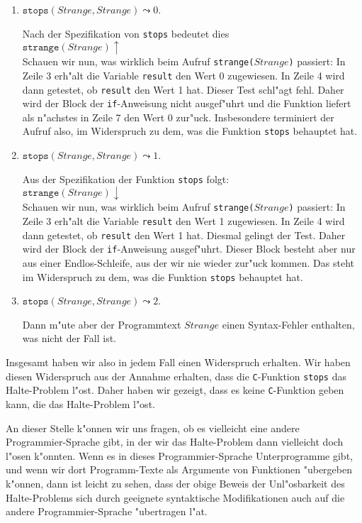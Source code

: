 \begin{enumerate}
\item $\mathtt{stops}(Strange, Strange) \leadsto 0$. 

      Nach der Spezifikation von \texttt{stops} bedeutet dies \\[0.3cm]
      \hspace*{1.3cm} $\mathtt{strange}(Strange) \uparrow$ \\[0.3cm]
      Schauen wir nun, was wirklich beim Aufruf \texttt{strange($Strange$)} passiert:
      In Zeile 3 erh"alt die Variable \texttt{result} den Wert 0 zugewiesen.  In Zeile 4
      wird dann getestet, ob \texttt{result} den Wert 1 hat.  Dieser Test schl"agt fehl.
      Daher wird der Block der \texttt{if}-Anweisung nicht ausgef"uhrt und die Funktion liefert als
      n"achstes in Zeile 7 den Wert 0 zur"uck.  Insbesondere terminiert der Aufruf also, im
      Widerspruch zu dem, was die Funktion \texttt{stops} behauptet hat.
\item  $\mathtt{stops}(Strange, Strange) \leadsto 1$. 

      Aus der Spezifikation der Funktion \texttt{stops} folgt: \\[0.3cm]
      \hspace*{1.3cm} $\mathtt{strange}(Strange) \downarrow$ \\[0.3cm]
      Schauen wir nun, was wirklich beim Aufruf \texttt{strange($Strange$)} passiert:
      In Zeile 3 erh"alt die Variable \texttt{result} den Wert 1 zugewiesen.  In Zeile 4
      wird dann getestet, ob \texttt{result} den Wert 1 hat.  Diesmal gelingt der Test.
      Daher wird der Block der \texttt{if}-Anweisung ausgef"uhrt.  Dieser Block
      besteht aber nur aus einer Endlos-Schleife, aus der wir nie wieder zur"uck kommen.
      Das steht im Widerspruch zu dem, was die Funktion \texttt{stops} behauptet hat.
\item  $\mathtt{stops}(Strange, Strange) \leadsto 2$. 

      Dann m"u\3te aber der Programmtext $Strange$ einen Syntax-Fehler enthalten, was nicht
      der Fall ist.
\end{enumerate}
Insgesamt haben wir also in jedem Fall einen Widerspruch erhalten.  
Wir haben diesen Widerspruch aus der Annahme erhalten, dass die \texttt{C}-Funktion \texttt{stops}
das Halte-Problem l"ost.  Daher haben wir gezeigt, dass es keine \texttt{C}-Funktion
geben kann, die das Halte-Problem l"ost.

An dieser Stelle k"onnen wir uns fragen, ob es vielleicht eine andere Programmier-Sprache
gibt, in der wir das Halte-Problem dann vielleicht doch l"osen k"onnten.  
Wenn es in dieses Programmier-Sprache Unterprogramme gibt, und wenn wir dort
Programm-Texte als Argumente von Funktionen "ubergeben k"onnen, dann ist leicht zu sehen,
dass der obige Beweis der 
Unl"osbarkeit des Halte-Problems sich durch geeignete syntaktische Modifikationen auch auf
die andere Programmier-Sprache "ubertragen l"a\3t.

